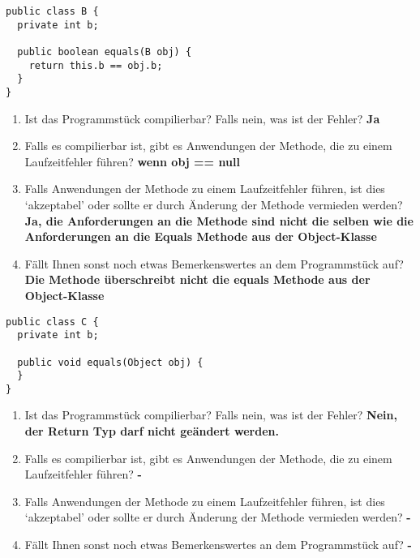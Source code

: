 \begin{lstlisting}
public class B {
  private int b;

  public boolean equals(B obj) {
    return this.b == obj.b;
  }
}
\end{lstlisting}
\begin{enumerate}
    \item Ist das Programmstück compilierbar? Falls nein, was ist der Fehler?\newline
          \textbf{Ja}
    \item Falls es compilierbar ist, gibt es Anwendungen der Methode, die zu einem
          Laufzeitfehler führen? \newline \textbf{wenn obj == null}
    \item Falls Anwendungen der Methode zu einem Laufzeitfehler führen, ist dies
          `akzeptabel' oder sollte er durch Änderung der Methode vermieden
          werden?\newline \textbf{Ja, die Anforderungen an die Methode sind nicht die
              selben wie die Anforderungen an die Equals Methode aus der Object-Klasse}
    \item Fällt Ihnen sonst noch etwas Bemerkenswertes an dem Programmstück auf?\newline
          \textbf{Die Methode überschreibt nicht die equals Methode aus der
              Object-Klasse}
\end{enumerate}
\pagebreak
\begin{lstlisting}
public class C {
  private int b;

  public void equals(Object obj) {
  }
}
\end{lstlisting}
\begin{enumerate}
    \item Ist das Programmstück compilierbar? Falls nein, was ist der Fehler? \newline
          \textbf{Nein, der Return Typ darf nicht geändert werden.}
    \item Falls es compilierbar ist, gibt es Anwendungen der Methode, die zu einem
          Laufzeitfehler führen? \newline\textbf{-}
    \item Falls Anwendungen der Methode zu einem Laufzeitfehler führen, ist dies
          `akzeptabel' oder sollte er durch Änderung der Methode vermieden werden?
          \newline \textbf{-}
    \item Fällt Ihnen sonst noch etwas Bemerkenswertes an dem Programmstück auf? \newline
          \textbf{-}
\end{enumerate}

